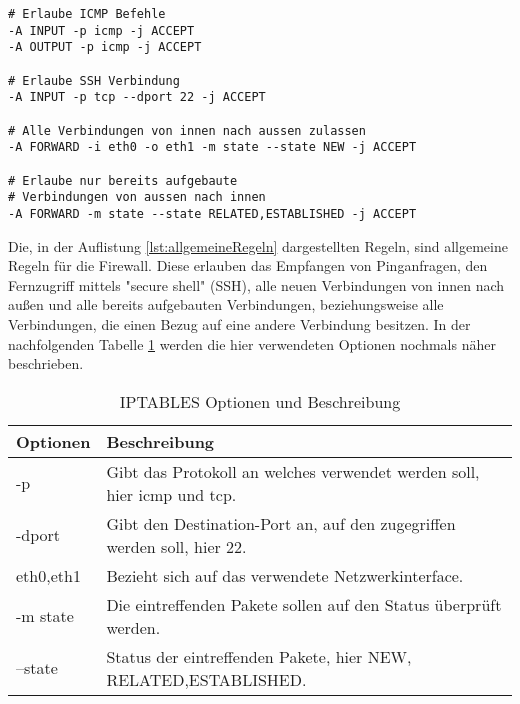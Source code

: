 \newline
\lstset{
	basicstyle=\footnotesize, frame=tb,
	xleftmargin=.2\textwidth, xrightmargin=.2\textwidth
}
\begin{lstlisting}[caption={Weitere allgemeine Firewallregeln},label=lst:allgemeineRegeln]
# Erlaube ICMP Befehle
-A INPUT -p icmp -j ACCEPT
-A OUTPUT -p icmp -j ACCEPT

# Erlaube SSH Verbindung
-A INPUT -p tcp --dport 22 -j ACCEPT

# Alle Verbindungen von innen nach aussen zulassen
-A FORWARD -i eth0 -o eth1 -m state --state NEW -j ACCEPT

# Erlaube nur bereits aufgebaute 
# Verbindungen von aussen nach innen
-A FORWARD -m state --state RELATED,ESTABLISHED -j ACCEPT
\end{lstlisting}
\vspace{\baselineskip}
Die, in der Auflistung \ref{lst:allgemeineRegeln} dargestellten Regeln, sind allgemeine Regeln für die Firewall. Diese erlauben das Empfangen von Pinganfragen, den Fernzugriff mittels "secure shell" (SSH), alle neuen Verbindungen von innen nach außen und alle bereits aufgebauten Verbindungen, beziehungsweise alle Verbindungen, die einen Bezug auf eine andere Verbindung besitzen. In der nachfolgenden Tabelle \ref*{tab:iptablesOptionen} werden die hier verwendeten Optionen nochmals näher beschrieben.
\begin{table}[h]
	\centering
\begin{tabular}{|p{2cm}|p{13cm}|}
	\hline 
	Optionen & Beschreibung \\ 
	\hline 
	-p & Gibt das Protokoll an welches verwendet werden soll, hier icmp und tcp. \\ 
	\hline 
	-dport & Gibt den Destination-Port an, auf den zugegriffen werden soll, hier 22. \\ 
	\hline
	eth0,eth1 & Bezieht sich auf das verwendete Netzwerkinterface. \\ 
	\hline 
	-m state & Die eintreffenden Pakete sollen auf den Status überprüft werden. \\ 
	\hline 
	--state & Status der eintreffenden Pakete, hier NEW, RELATED,ESTABLISHED. \\ 
	\hline 
\end{tabular} 
\caption{IPTABLES Optionen und Beschreibung} \label{tab:iptablesOptionen}
\end{table}
